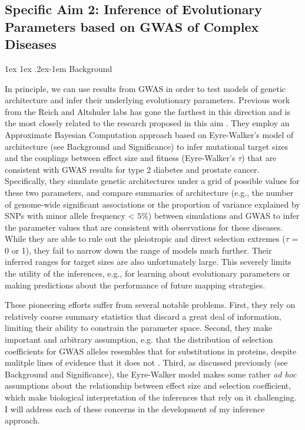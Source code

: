\message{ !name(ResearchStrategy.tex)}\documentclass[11pt]{article}
\makeatletter
\renewcommand{\paragraph}{%
  \@startsection{paragraph}{4}%
  {\z@}{1ex \@plus 1ex \@minus .2ex}{-1em}%
  {\normalfont\normalsize\bfseries}%
}
\makeatother
\begin{document}
\subsection*{Specific Aim 2: Inference of Evolutionary Parameters based on GWAS of Complex Diseases}

\paragraph{Background}

In principle, we can use results from GWAS in order to test models of genetic architecture and infer their underlying evolutionary parameters. Previous work from the Reich and Altshuler labs has gone the farthest in this direction and is the most closely related to the research proposed in this aim \cite{Agarwala:2013bu, Fuchsberger:2016df, Mancuso:2015cp}.  They employ an Approximate Bayesian Computation approach based on Eyre-Walker’s model of architecture\cite{EyreWalker:2010dn} (see Background and Significance) to infer mutational target sizes and the couplings between effect size and fitness (Eyre-Walker’s $\tau$) that are consistent with GWAS results for type 2 diabetes\cite{Agarwala:2013bu,Fuchsberger:2016df} and prostate cancer\cite{Mancuso:2015cp}. Specifically, they simulate genetic architectures under a grid of possible values for these two parameters, and compare summaries of architecture (e.g., the number of genome-wide significant associations\cite{Agarwala:2013bu} or the proportion of variance explained by SNPs with minor allele frequency < $5\%$\cite{Fuchsberger:2016df,Mancuso:2015cp}) between simulations and GWAS to infer the parameter values that are consistent with observations for these diseases. While they are able to rule out the pleiotropic and direct selection extremes ($\tau$ = 0 or 1), they fail to narrow down the range of models much further. Their inferred ranges for target sizes are also unfortunately large. This severely limits the utility of the inferences, e.g., for learning about evolutionary parameters or making predictions about the performance of future mapping strategies.

These pioneering efforts suffer from several notable problems. First, they rely on relatively coarse summary statistics that discard a great deal of information, limiting their ability to constrain the parameter space. Second, they make important and arbitrary assumption, e.g. that the distribution of selection coefficients for GWAS alleles resembles that for substitutions in proteins, despite mulitple lines of evidence that it does not \cite{EyreWalker:2007dl,Pickrell:2014bw,Racimo:2014cb}. Third, as discussed previously (see Background and Significance), the Eyre-Walker model makes some rather \textit{ad hoc} assumptions about the relationship between effect size and selection coefficient, which make biological interpretation of the inferences that rely on it challenging. I will address each of these concerns in the development of my inference approach.
\end{document}
